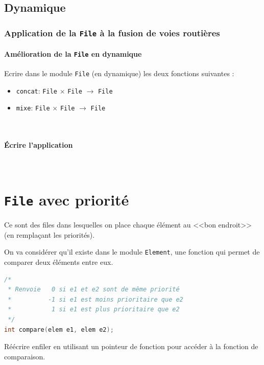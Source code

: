 	\subsection{Dynamique}



\subsubsection{Application de la \texttt{File} à la fusion de voies routières}
\paragraph{Amélioration de la \texttt{File} en dynamique} Ecrire dans le module \texttt{File} (en dynamique) les deux fonctions suivantes : 
\begin{itemize}
	\item \texttt{concat}: \texttt{File} $\times$ \texttt{File} $\rightarrow$ \texttt{File}
	\item \texttt{mixe}: \texttt{File} $\times$ \texttt{File} $\rightarrow$ \texttt{File}
\end{itemize} ~


\paragraph{Écrire l'application} ~

\section{\texttt{File} avec priorité}
Ce sont des files dans lesquelles on place chaque élément au <<bon endroit>> (en remplaçant les priorités).

On va considérer qu'il existe dans le module \texttt{Element}, une fonction qui permet de comparer deux éléments entre eux.
\begin{lstlisting}[language=C, numbers=none,caption=Fonction comparer]
/*
 * Renvoie   0 si e1 et e2 sont de même priorité
 *			-1 si e1 est moins prioritaire que e2
 *           1 si e1 est plus prioritaire que e2
 */
int compare(elem e1, elem e2);
\end{lstlisting}
Réécrire enfiler en utilisant un pointeur de fonction pour accéder à la fonction de comparaison.
